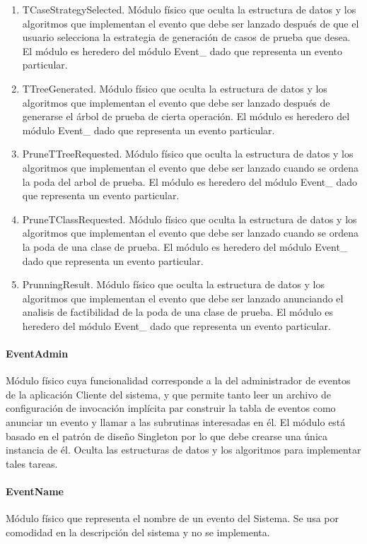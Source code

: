 \documentclass[a4paper,10pt]{report}
\begin{document}
\begin{enumerate}
					\item{TCaseStrategySelected. Módulo físico que oculta la estructura de datos y los algoritmos que implementan el evento que debe ser lanzado después de que el usuario selecciona la estrategia de generación de casos de prueba que desea. El módulo es heredero del módulo Event\_ dado que representa un evento particular.}
					\item{TTreeGenerated. Módulo físico que oculta la estructura de datos y los algoritmos que implementan el evento que debe ser lanzado después de generarse el árbol de prueba de cierta operación. El módulo es heredero del módulo Event\_ dado que representa un evento particular.}
					\item{PruneTTreeRequested. Módulo físico que oculta la estructura de datos y los algoritmos que implementan el evento que debe ser lanzado cuando se ordena la poda del arbol de prueba. El módulo es heredero del módulo Event\_ dado que representa un evento particular.}
					\item{PruneTClassRequested. Módulo físico que oculta la estructura de datos y los algoritmos que implementan el evento que debe ser lanzado cuando se ordena la poda de una clase de prueba. El módulo es heredero del módulo Event\_ dado que representa un evento particular.}
					\item{PrunningResult. Módulo físico que oculta la estructura de datos y los algoritmos que implementan el evento que debe ser lanzado anunciando el analisis de factibilidad de la poda de una clase de prueba. El módulo es heredero del módulo Event\_ dado que representa un evento particular.}
					\end{enumerate}
				\paragraph{EventAdmin}
				Módulo físico cuya funcionalidad corresponde a la del administrador de eventos de la aplicación Cliente del sistema, y que permite tanto leer un archivo de configuración de invocación implícita par construir la tabla de eventos como anunciar un evento y llamar a las subrutinas interesadas en él. El módulo está basado en el patrón de diseño Singleton por lo que debe crearse una única instancia de él. Oculta las estructuras de datos y los algoritmos para implementar tales tareas.
				\paragraph{EventName}
				Módulo físico que representa el nombre de un evento del Sistema. Se usa por comodidad en la descripción del sistema y no se implementa.
\end{document}
